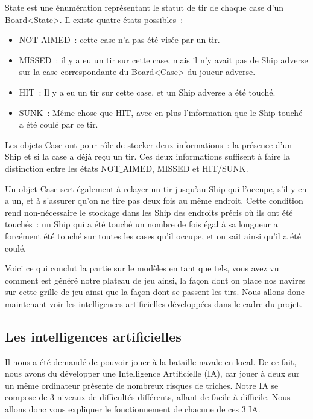 	State est une énumération représentant le statut de tir de chaque case d'un Board<State>. Il existe quatre états possibles~:
	\begin{itemize}
		\item NOT$\_$AIMED~: cette case n'a pas été visée par un tir.
		\item MISSED~: il y a eu un tir sur cette case, mais il n'y avait pas de Ship adverse sur la case correspondante du Board<Case> du joueur adverse.
		\item HIT~: Il y a eu un tir sur cette case, et un Ship adverse a été touché.
		\item SUNK~: Même chose que HIT, avec en plus l'information que le Ship touché a été coulé par ce tir.
	\end{itemize}

	Les objets Case ont pour rôle de stocker deux informations~: la présence d'un Ship et si la case a déjà reçu un tir. Ces deux informations suffisent à faire la distinction entre les états NOT$\_$AIMED, MISSED et HIT/SUNK. \newline
	
	Un objet Case sert également à relayer un tir jusqu'au Ship qui l'occupe, s'il y en a un, et à s'assurer qu'on ne tire pas deux fois au même endroit. Cette condition rend non-nécessaire le stockage dans les Ship des endroits précis où ils ont été touchés~: un Ship qui a été touché un nombre de fois égal à sa longueur a forcément été touché sur toutes les cases qu'il occupe, et on sait ainsi qu'il a été coulé.\newline	
	
	Voici ce qui conclut la partie sur le modèles en tant que tels, vous avez vu comment est généré notre plateau de jeu ainsi, la façon dont on place nos navires sur cette grille de jeu ainsi que la façon dont se passent les tirs. Nous allons donc maintenant voir les intelligences artificielles développées dans le cadre du projet.
	
	\newpage

\subsection{Les intelligences artificielles}
	Il nous a été demandé de pouvoir jouer à la bataille navale en local. 
De ce fait, nous avons du développer une Intelligence Artificielle (IA), car jouer à deux sur un même ordinateur présente de nombreux risques de triches.\newline
	Notre IA se compose de 3 niveaux de difficultés différents, allant de facile à difficile. Nous allons donc vous expliquer le fonctionnement de chacune de ces 3 IA.\newline

